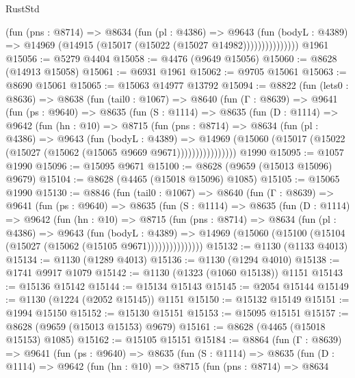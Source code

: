 \begin{lexlean}{RustStd}
\begin{coremodule}
                    (fun (pns : @8714) =>
                    @8634
                      (fun (pl : @4386) =>
                      @9643
                        (fun (bodyL : @4389) =>
                        @14969 (@14915 (@15017 (@15022 (@15027 @14982)))))))))))))))
    @1961
@15056 := @5279 @4404
@15058 := @4476 (@9649 @15056)
@15060 := @8628 (@14913 @15058)
@15061 := @6931 @1961
@15062 := @9705 @15061
@15063 := @8690 @15061
@15065 := @15063 @14977 @13792
@15094 := @8822
    (fun (lets0 : @8636) =>
    @8638
      (fun (tail0 : @1067) =>
      @8640
        (fun (Γ : @8639) =>
        @9641
          (fun (ps : @9640) =>
          @8635
            (fun (S : @1114) =>
            @8635
              (fun (D : @1114) =>
              @9642
                (fun (hn : @10) =>
                @8715
                  (fun (pns : @8714) =>
                  @8634
                    (fun (pl : @4386) =>
                    @9643
                      (fun (bodyL : @4389) =>
                      @14969
                        (@15060 (@15017 (@15022 (@15027 (@15062 (@15065 @9669 @9671))))))))))))))))
    @1990
@15095 := @1057 @1990
@15096 := @15095 @9671
@15100 := @8628 (@9659 (@15013 @15096) @9679)
@15104 := @8628 (@4465 (@15018 @15096) @1085)
@15105 := @15065 @1990
@15130 := @8846
    (fun (tail0 : @1067) =>
    @8640
      (fun (Γ : @8639) =>
      @9641
        (fun (ps : @9640) =>
        @8635
          (fun (S : @1114) =>
          @8635
            (fun (D : @1114) =>
            @9642
              (fun (hn : @10) =>
              @8715
                (fun (pns : @8714) =>
                @8634
                  (fun (pl : @4386) =>
                  @9643
                    (fun (bodyL : @4389) =>
                    @14969 (@15060 (@15100 (@15104 (@15027 (@15062 (@15105 @9671)))))))))))))))
@15132 := @1130 (@1133 @4013)
@15134 := @1130 (@1289 @4013)
@15136 := @1130 (@1294 @4010)
@15138 := @1741 @9917 @1079
@15142 := @1130 (@1323 (@1060 @15138)) @1151
@15143 := @15136 @15142
@15144 := @15134 @15143
@15145 := @2054 @15144
@15149 := @1130 (@1224 (@2052 @15145)) @1151
@15150 := @15132 @15149
@15151 := @1994 @15150
@15152 := @15130 @15151
@15153 := @15095 @15151
@15157 := @8628 (@9659 (@15013 @15153) @9679)
@15161 := @8628 (@4465 (@15018 @15153) @1085)
@15162 := @15105 @15151
@15184 := @8864
    (fun (Γ : @8639) =>
    @9641
      (fun (ps : @9640) =>
      @8635
        (fun (S : @1114) =>
        @8635
          (fun (D : @1114) =>
          @9642
            (fun (hn : @10) =>
            @8715
              (fun (pns : @8714) =>
              @8634

\end{coremodule}
\end{lexlean}
